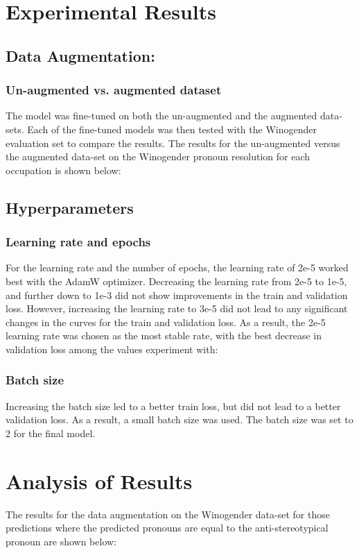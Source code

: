 \documentclass[10pt]{article}
\begin{document}
\section{Experimental Results} \label{exp_results}
\subsection{Data Augmentation: }
\subsubsection{Un-augmented vs. augmented dataset}
The model was fine-tuned on both the un-augmented and the augmented data-sets. Each of the fine-tuned models was then tested with the Winogender evaluation set to compare the results. The results for the un-augmented versus the augmented data-set on the Winogender pronoun resolution for each occupation is shown below:

\subsection{Hyperparameters}
\subsubsection{Learning rate and epochs}
For the learning rate and the number of epochs, the learning rate of 2e-5 worked best with the AdamW optimizer. Decreasing the learning rate from 2e-5 to 1e-5, and further down to 1e-3 did not show improvements in the train and validation loss. However, increasing the learning rate to 3e-5 did not lead to any significant changes in the curves for the train and validation loss. As a result, the 2e-5 learning rate was chosen as the most stable rate, with the best decrease in validation loss among the values experiment with:

\subsubsection{Batch size}
Increasing the batch size led to a better train loss, but did not lead to a better validation loss. As a result, a small batch size was used. The batch size was set to 2 for the final model.

\section{Analysis of Results}
The results for the data augmentation on the Winogender data-set for those predictions where the predicted pronouns are equal to the anti-stereotypical pronoun are shown below:
\end{document}
